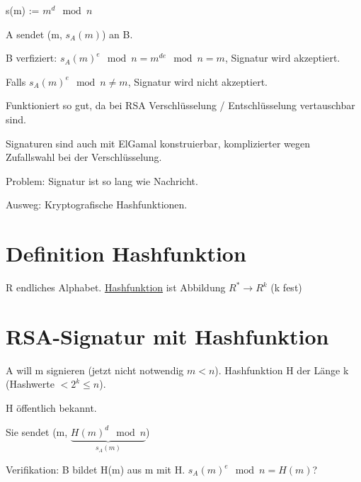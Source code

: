   \begin{center}
    s(m) := $m^d \mod n$
  \end{center}

  A sendet (m, $s_A(m)$) an B.

  B verfiziert: $s_A(m)^e \mod n = m^{de} \mod n = m$, Signatur wird akzeptiert.

  \par \medskip

  Falls $s_A(m)^e \mod n \neq m$, Signatur wird nicht akzeptiert.

  \par \medskip

  \par \medskip

  Funktioniert so gut, da bei RSA Verschlüsselung / Entschlüsselung vertauschbar sind.

  \par \medskip

  Signaturen sind auch mit ElGamal konstruierbar, komplizierter wegen Zufallswahl bei der Verschlüsselung.

  \par \medskip

  Problem: Signatur ist so lang wie Nachricht.

  \par \medskip

  Ausweg: Kryptografische Hashfunktionen.

  \section{Definition Hashfunktion}

  R endliches Alphabet. \underline{Hashfunktion} ist Abbildung $R^* \rightarrow R^k$ (k fest)

  \section{RSA-Signatur mit Hashfunktion}

  A will m signieren (jetzt nicht notwendig $m < n$). Hashfunktion H der Länge k (Hashwerte $< 2^k \le n$).

  H öffentlich bekannt.

  Sie sendet (m, $\underbrace{H(m)^d \mod n}_{s_A(m)}$)

  \par \medskip

  Verifikation: B bildet H(m) aus m mit H. $s_A(m)^e \mod n = H(m)$? 

